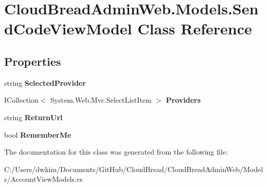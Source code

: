 \hypertarget{class_cloud_bread_admin_web_1_1_models_1_1_send_code_view_model}{}\section{Cloud\+Bread\+Admin\+Web.\+Models.\+Send\+Code\+View\+Model Class Reference}
\label{class_cloud_bread_admin_web_1_1_models_1_1_send_code_view_model}
\subsection*{Properties}
\begin{DoxyCompactItemize}
\item 
string {\bfseries Selected\+Provider}\hypertarget{class_cloud_bread_admin_web_1_1_models_1_1_send_code_view_model_ab0528350f52b5f745afc47ffcfa252f9}{}\label{class_cloud_bread_admin_web_1_1_models_1_1_send_code_view_model_ab0528350f52b5f745afc47ffcfa252f9}

\item 
I\+Collection$<$ System.\+Web.\+Mvc.\+Select\+List\+Item $>$ {\bfseries Providers}\hypertarget{class_cloud_bread_admin_web_1_1_models_1_1_send_code_view_model_ab27018cdedf43ffbcecf30a252a2a62c}{}\label{class_cloud_bread_admin_web_1_1_models_1_1_send_code_view_model_ab27018cdedf43ffbcecf30a252a2a62c}

\item 
string {\bfseries Return\+Url}\hypertarget{class_cloud_bread_admin_web_1_1_models_1_1_send_code_view_model_a37e3906c472dcea0abed5ed25c1819bd}{}\label{class_cloud_bread_admin_web_1_1_models_1_1_send_code_view_model_a37e3906c472dcea0abed5ed25c1819bd}

\item 
bool {\bfseries Remember\+Me}\hypertarget{class_cloud_bread_admin_web_1_1_models_1_1_send_code_view_model_a15ffe12c85ebe53d6ee1a2a832fd5329}{}\label{class_cloud_bread_admin_web_1_1_models_1_1_send_code_view_model_a15ffe12c85ebe53d6ee1a2a832fd5329}

\end{DoxyCompactItemize}


The documentation for this class was generated from the following file\+:\begin{DoxyCompactItemize}
\item 
C\+:/\+Users/dwkim/\+Documents/\+Git\+Hub/\+Cloud\+Bread/\+Cloud\+Bread\+Admin\+Web/\+Models/Account\+View\+Models.\+cs\end{DoxyCompactItemize}
